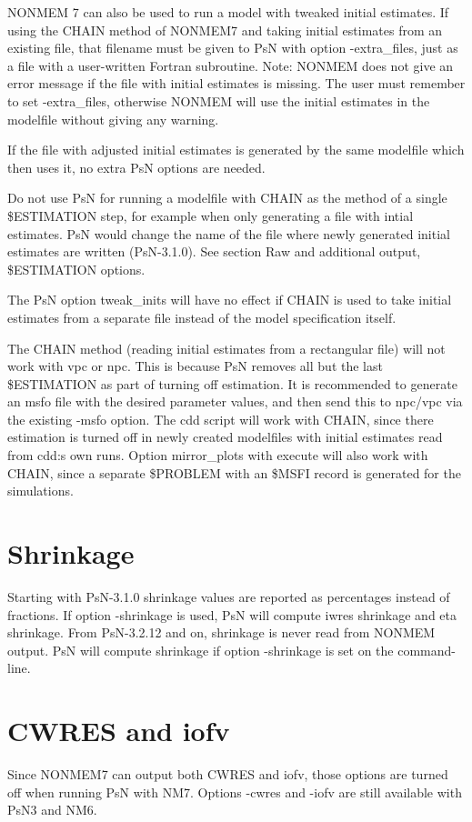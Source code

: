 NONMEM 7 can also be used to run a model with tweaked initial estimates. If using the CHAIN method of NONMEM7 and taking initial estimates from an existing file, that filename must be given to PsN with option -extra\_files, just as a file with a user-written Fortran subroutine. Note: NONMEM does not give an error message if the file with initial estimates is missing. The user must remember to set -extra\_files, otherwise NONMEM will use the initial estimates in the modelfile without giving any warning.

If the file with adjusted initial estimates is generated by the same modelfile which then uses it, no extra PsN options are needed.

Do not use PsN for running a modelfile with CHAIN as the method of a single \$ESTIMATION step, for example when only generating a file with intial estimates. PsN would change the name of the file where newly generated initial estimates are written (PsN-3.1.0). See section Raw and additional output, \$ESTIMATION options.

The PsN option tweak\_inits will have no effect if CHAIN is used to take initial estimates from a separate file instead of the model specification itself.

The CHAIN method (reading initial estimates from a rectangular file) will not work with vpc or npc. This is because PsN removes all but the last \$ESTIMATION as part of turning off estimation. It is recommended to generate an msfo file with the desired parameter values, and then send this to npc/vpc via the existing -msfo option. The cdd script will work with CHAIN, since there estimation is turned off in newly created modelfiles with initial estimates read from cdd:s own runs. Option mirror\_plots with execute will also work with CHAIN, since a separate \$PROBLEM with an \$MSFI record is generated for the simulations.

\section{Shrinkage}

Starting with PsN-3.1.0 shrinkage values are reported as percentages instead of fractions. If option -shrinkage is used, PsN will compute iwres shrinkage and eta shrinkage. From PsN-3.2.12 and on, shrinkage is never read from NONMEM output. PsN will compute shrinkage if option -shrinkage is set on the command-line.

\section{CWRES and iofv}

Since NONMEM7 can output both CWRES and iofv, those options are turned off when running PsN with NM7. Options -cwres and -iofv are still available with PsN3 and NM6.


